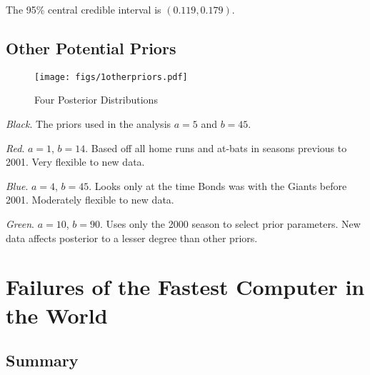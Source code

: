 \documentclass[12pt]{article}
\begin{document}
\noindent The 95\% central credible interval is $(0.119, 0.179)$.

\subsection{Other Potential Priors}


\begin{figure}[H]
\begin{center}
\texttt{[image: figs/1otherpriors.pdf]}
\caption{Four Posterior Distributions}
\end{center}
\end{figure}

\noindent \textit{Black}.  The priors used in the analysis $a=5$ and $b=45$.

\noindent \textit{Red}. $a=1$, $b=14$.  Based off all home runs and at-bats in seasons previous to 2001.  Very flexible to new data.

\noindent \textit{Blue}. $a=4$, $b=45$.  Looks only at the time Bonds was with the Giants before 2001.  Moderately flexible to new data.

\noindent \textit{Green}. $a=10$, $b=90$.  Uses only the 2000 season to select prior parameters.  New data affects posterior to a lesser degree than other priors.

%

\newpage

\section{Failures of the Fastest Computer in the World}

\subsection{Summary}
\end{document}
